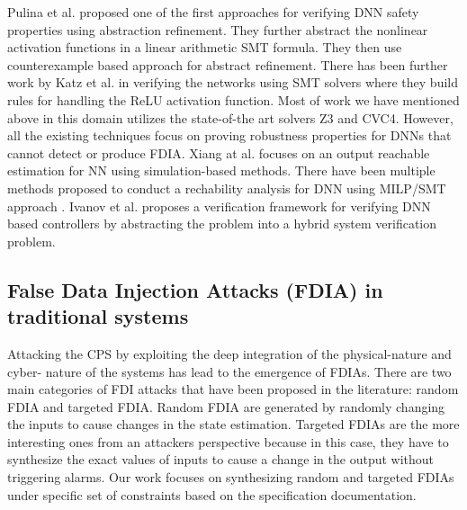Pulina et al.\cite{10.1007/978-3-642-14295-6_24} proposed one of the first approaches for verifying DNN safety properties using abstraction refinement. They further abstract \cite{article} the nonlinear activation functions in a linear arithmetic SMT formula. They then use counterexample based approach for abstract refinement. There has been further work by Katz et al.\cite{10.1007/978-3-319-63387-9_5} in verifying the networks using SMT solvers where they build rules for handling the ReLU activation function. Most of work we have mentioned above in this domain utilizes the state-of-the art solvers Z3 and CVC4. However, all the existing techniques focus on proving robustness properties \cite{NIPS2016_6339} for DNNs that cannot detect or produce FDIA. Xiang at al.\cite{xiang2017output} focuses on an output reachable estimation for NN using simulation-based methods. There have been multiple methods proposed to conduct a rechability  analysis for DNN using MILP/SMT approach \cite{10.1145/3302504.3313351} \cite{ehlers2017formal} \cite{10.1007/978-3-319-63387-9_5} \cite{lomuscio2017approach} \cite{article}. Ivanov et al. \cite{ivanov2018verisig} proposes a verification framework for verifying DNN based controllers by abstracting the problem into a hybrid system verification problem.  

\subsection{False Data Injection Attacks (FDIA) in traditional systems}
Attacking the CPS by exploiting the deep integration of the physical-nature and cyber- nature of the systems has lead to the emergence of FDIAs. 
There are two main categories of FDI attacks that have been proposed in the literature: random FDIA and targeted FDIA. Random FDIA are generated by randomly changing the inputs to cause changes in the state estimation. Targeted FDIAs are the more interesting ones from an attackers perspective because in this case, they have to synthesize the exact values of inputs to cause a change in the output without triggering alarms. Our work focuses on synthesizing random and targeted FDIAs under specific set of constraints based on the specification documentation. 

